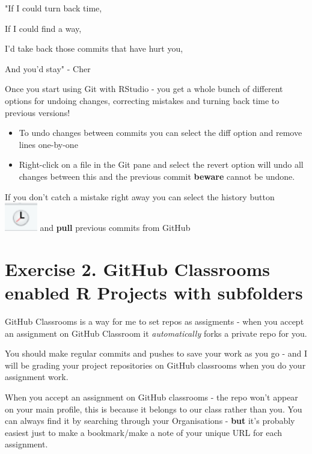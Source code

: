 \documentclass[
]{book}
\makeatletter
\newenvironment{kframe}{%
\medskip{}
\setlength{\fboxsep}{.8em}
 \def\at@end@of@kframe{}%
 \ifinner\ifhmode%
  \def\at@end@of@kframe{\end{minipage}}%
  \begin{minipage}{\columnwidth}%
 \fi\fi%
 \def\FrameCommand##1{\hskip\@totalleftmargin \hskip-\fboxsep
 \colorbox{shadecolor}{##1}\hskip-\fboxsep
     \hskip-\linewidth \hskip-\@totalleftmargin \hskip\columnwidth}%
 \MakeFramed {\advance\hsize-\width
   \@totalleftmargin\z@ \linewidth\hsize
   \@setminipage}}%
 {\par\unskip\endMakeFramed%
 \at@end@of@kframe}
\newenvironment{block}[1]
  {
  \begin{itemize}
  \renewcommand{\labelitemi}{
    \raisebox{-.7\height}[0pt][0pt]{
      {\setkeys{Gin}{width=3em,keepaspectratio}\texttt{[image: images/\#1]}}
    }
  }
  \setlength{\fboxsep}{1em}
  \begin{kframe}
  \item
  }
  {
  \end{kframe}
  \end{itemize}
  }
\newenvironment{rmdwarning}
  {\begin{block}{warning}}
  {\end{block}}
\makeatother
\begin{document}
"If I could turn back time,

If I could find a way,

I'd take back those commits that have hurt you,

And you'd stay" - Cher

Once you start using Git with RStudio - you get a whole bunch of different options for undoing changes, correcting mistakes and turning back time to previous versions!

\begin{itemize}
\item
  To undo changes between commits you can select the diff option and remove lines one-by-one
\item
  Right-click on a file in the Git pane and select the revert option will undo all changes between this and the previous commit \textbf{beware} cannot be undone.
\end{itemize}

If you don't catch a mistake right away you can select the history button
\includegraphics[width=0.56in]{images/git-history} and \textbf{pull} previous commits from GitHub

\hypertarget{exercise-2.-github-classrooms-enabled-r-projects-with-subfolders}{%
\section{\texorpdfstring{\textbf{Exercise 2.} GitHub Classrooms enabled R Projects with subfolders}{Exercise 2. GitHub Classrooms enabled R Projects with subfolders}}\label{exercise-2.-github-classrooms-enabled-r-projects-with-subfolders}}

GitHub Classrooms is a way for me to set repos as assigments - when you accept an assignment on GitHub Classroom it \emph{automatically} forks a private repo for you.

You should make regular commits and pushes to save your work as you go - and I will be grading your project repositories on GitHub classrooms when you do your assignment work.

\begin{rmdwarning}
When you accept an assignment on GitHub classrooms - the repo won't
appear on your main profile, this is because it belongs to our class
rather than you. You can always find it by searching through your
Organisations - \textbf{but} it's probably easiest just to make a
bookmark/make a note of your unique URL for each assignment.
\end{rmdwarning}
\end{document}
